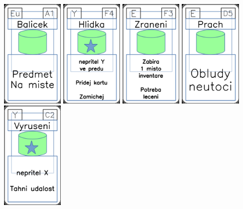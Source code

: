 \documentclass[a4paper]{article}
\begin{document}
	\includegraphics[width=3.0cm]{img-4_30}
	\includegraphics[width=3.0cm]{img-5_28}
	\includegraphics[width=3.0cm]{img-4_57}
	\includegraphics[width=3.0cm]{img-4_49}
	\includegraphics[width=3.0cm]{img-5_41}
\end{document}
